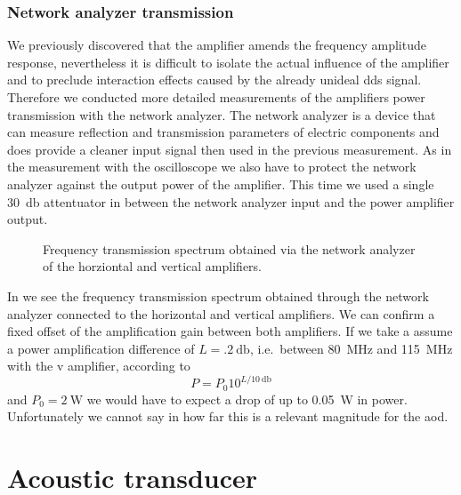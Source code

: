 \subsubsection{Network analyzer transmission}

We previously discovered that the amplifier amends the frequency amplitude
response, nevertheless it is difficult to isolate the actual influence of
the amplifier and to preclude interaction effects caused by the already
unideal \gls{dds} signal. Therefore we conducted more detailed measurements
of the amplifiers power transmission with the network analyzer. The network
analyzer is a device that can measure reflection and transmission parameters
of electric components and does provide a cleaner input signal then used in
the previous measurement. As in the measurement with the oscilloscope we also
have to protect the network analyzer against the output power of the
amplifier. This time we used a single \SI{30}{\decibel} attentuator in between
the network analyzer input and the power amplifier output.
\begin{figure}[htb]
  \centering
  \begin{adjustbox}{width=\textwidth}
    
  \end{adjustbox}
  \caption{Frequency transmission spectrum obtained via the network analyzer
    of the horziontal and vertical amplifiers.
  }\label{fig:signal_amplification_spectrum}
\end{figure}
In  we see the frequency transmission
spectrum obtained through the network analyzer connected to the horizontal
and vertical amplifiers. We can confirm a fixed offset of the amplification
gain between both amplifiers. If we take a assume a power amplification
difference of $L=\SI{.2}{\decibel}$, i.e.\ between \SI{80}{\mega\hertz} and
\SI{115}{\mega\hertz} with the \gls{v} amplifier, according to
\begin{equation}
  P
  =
  P_0 10^{L/\SI{10}{\decibel}}
  \label{eq:power_gain_decibel}
\end{equation}
and $P_0=\SI{2}{\watt}$ we would have to expect a drop of up to
\SI{.05}{\watt} in power. Unfortunately we cannot say in how far this is
a relevant magnitude for the \gls{aod}.

\section{Acoustic transducer}

